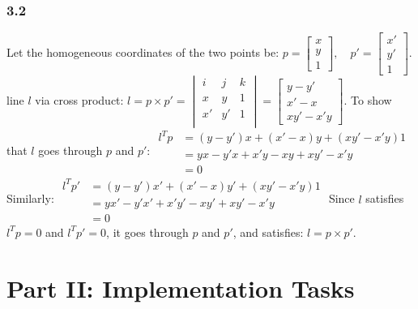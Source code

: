 \documentclass{article}
\begin{document}
\subsubsection*{3.2}
Let the homogeneous coordinates of the two points be:\newline
$
p = \begin{bmatrix} x \\ y \\ 1 \end{bmatrix}, 
\quad p' = \begin{bmatrix} x' \\ y' \\ 1 \end{bmatrix}.
$\newline
line $l$ via cross product:\newline
$
l = p \times p' 
= \begin{vmatrix}
    i & j & k\\
    x & y & 1\\
    x' & y' & 1\\
\end{vmatrix}
=\begin{bmatrix}
    y - y' \\[1mm] 
    x' - x \\[1mm] 
    xy' - x'y 
\end{bmatrix}.
$\newline
To show that \( l \) goes through \( p \) and \( p' \):\newline
$
\begin{aligned}
    l^T p &= (y - y') x + (x' - x) y + (xy' - x'y) 1\\
    &= yx - y'x + x'y - xy + xy' - x'y\\
    &= 0
\end{aligned}
$\newline
Similarly:\newline
$
\begin{aligned}
    l^T p' &= (y - y') x' + (x' - x) y' + (xy' - x'y) 1\\
    &= yx' - y'x' + x'y' - xy' + xy' - x'y\\
    &= 0
\end{aligned}
$\newline
Since \( l \) satisfies \( l^T p = 0 \) and \( l^T p' = 0 \), it goes through \( p \) and \( p' \), and satisfies: $l = p \times p'$.



\newpage
\section*{Part II: Implementation Tasks}
\end{document}
